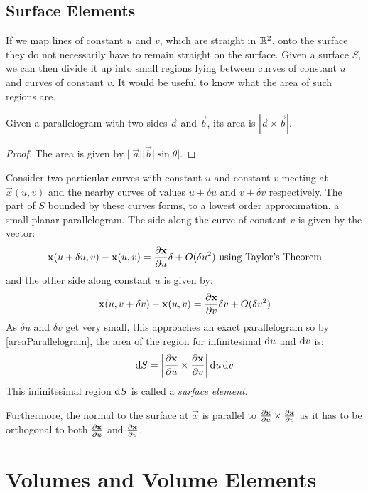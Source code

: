 \documentclass[../main.tex]{subfiles}
\begin{document}
\subsection{Surface Elements}
\label{surfaceElements}
If we map lines of constant $u$ and $v$, which are straight in $\mathbb{R}^2$, onto the surface they do not necessarily have to remain straight on the surface.
Given a surface $S$, we can then divide it up into small regions lying between curves of constant $u$ and curves of constant $v$.
It would be useful to know what the area of such regions are.
\begin{lemma}
  Given a parallelogram with two sides $\vec{a}$ and $\vec{b}$, its area is $|\vec{a} \times \vec{b}|$.
  \label{areaParallelogram}
\end{lemma}
\begin{proof}
  The area is given by $||\vec{a}||\vec{b}|\sin\theta|$.
\end{proof}
Consider two particular curves with constant $u$ and constant $v$ meeting at $\vec{x}(u, v)$ and the nearby curves of values $u + \delta u$ and $v + \delta v$ respectively.
The part of $S$ bounded by these curves forms, to a lowest order approximation, a small planar parallelogram.
The side along the curve of constant $v$ is given by the vector:
\[
  \vec{x}(u + \delta u, v) - \vec{x}(u, v) = \pderiv{\vec{x}}{u} \delta + O(\delta u^2) \text{ using Taylor's Theorem}
\]
and the other side along constant $u$ is given by:
\[
  \vec{x}(u, v + \delta v) - \vec{x}(u, v) = \pderiv{\vec{x}}{v} \delta v + O(\delta v^2)
\]
As $\delta u$ and $\delta v$ get very small, this approaches an exact parallelogram so by \cref{areaParallelogram}, the area of the region for infinitesimal $\d{u}$ and $\d{v}$ is:
\[
  \d{S} = \abs{\pderiv{\vec{x}}{u} \times \pderiv{\vec{x}}{v}}\d{u}\d{v}
\]
This infinitesimal region $\d{S}$ is called a \textit{surface element}.

Furthermore, the normal to the surface at $\vec{x}$ is parallel to $\pderiv{\vec{x}}{u} \times \pderiv{\vec{x}}{v}$ as it has to be orthogonal to both $\pderiv{\vec{x}}{u}$ and $\pderiv{\vec{x}}{v}$.
\section{Volumes and Volume Elements}
\end{document}
